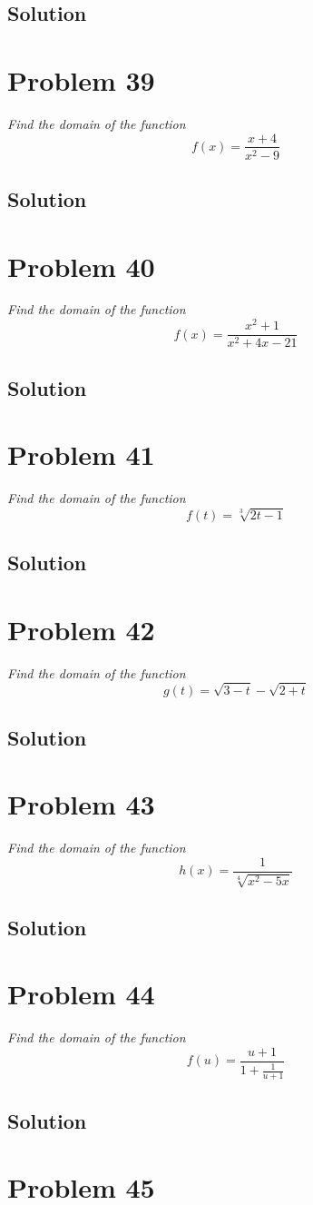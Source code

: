 \documentclass[11pt]{article}
\newcommand{\soln}{\subsection*}
\newcommand{\qn}{\textit}
\begin{document}
\soln{Solution}

\section*{Problem 39}

\qn{Find the domain of the function $$f(x)=\frac{x+4}{x^2-9}$$}

\soln{Solution}

\section*{Problem 40}

\qn{Find the domain of the function $$f(x)=\frac{x^2+1}{x^2+4x-21}$$}

\soln{Solution}

\section*{Problem 41}

\qn{Find the domain of the function $$f(t)=\sqrt[3]{2t-1}$$}

\soln{Solution}

\section*{Problem 42}

\qn{Find the domain of the function $$g(t)=\sqrt{3-t}-\sqrt{2+t}$$}

\soln{Solution}

\section*{Problem 43}

\qn{Find the domain of the function $$h(x)=\frac{1}{\sqrt[4]{x^2-5x}}$$}

\soln{Solution}

\section*{Problem 44}

\qn{Find the domain of the function $$f(u)=\frac{u+1}{1+\frac{1}{u+1}}$$}

\soln{Solution}

\section*{Problem 45}
\end{document}

